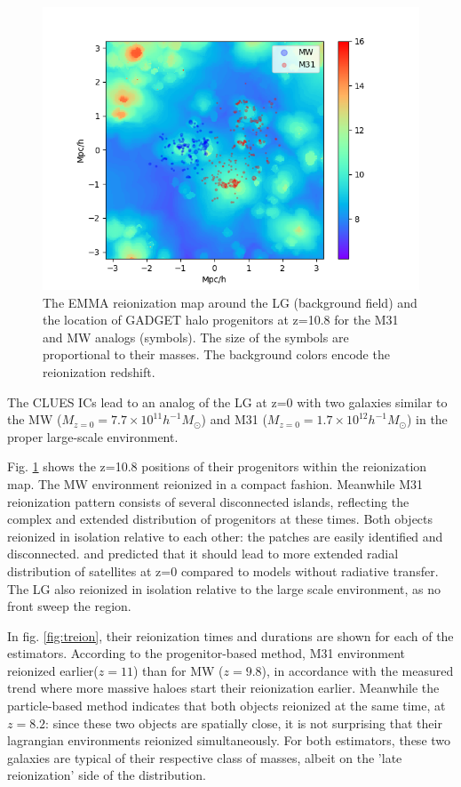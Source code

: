 \documentclass[twocolumn]{aastex61}
\begin{document}
\begin{figure}[ht]
\includegraphics[width=1.2\columnwidth]{img/map_LG.png}
\caption{The EMMA reionization map around the LG (background field) and the location of GADGET halo progenitors at z=10.8 for the M31 and MW analogs (symbols). The size of the symbols are proportional to their masses. The background colors encode the reionization redshift.}
\label{fig:LG}
\end{figure}

The CLUES ICs lead to an analog of the LG at z=0 with two galaxies similar to the MW ($M_{z=0}=7.7\times 10^{11} h^{-1} M_\odot$) and M31 ($M_{z=0}=1.7 \times 10^{12} h^{-1} M_\odot$) in the proper large-scale environment.

Fig. \ref{fig:LG} shows the z=10.8 positions of their progenitors within the reionization map. The MW environment reionized in a compact fashion. Meanwhile M31 reionization pattern consists of several disconnected islands, reflecting the complex and extended distribution of progenitors at these times. Both objects reionized in isolation relative to each other: the patches are easily identified and disconnected. \cite{OCV11} and \cite{GIL15} predicted that it should lead to more extended radial distribution of satellites at z=0 compared to models without radiative transfer. The LG also reionized in isolation relative to the large scale environment, as no front sweep the region. 

In fig. \ref{fig:treion}, their reionization times and durations are shown for each of the estimators. According to the progenitor-based method, M31 environment reionized earlier($z=11$) than for MW ($z=9.8$), in accordance with the measured trend where more massive haloes start their reionization earlier. Meanwhile the particle-based method indicates that both objects reionized at the same time, at $z=8.2$: since these two objects are spatially close, it is not surprising that their lagrangian environments reionized simultaneously. For both estimators, these two galaxies are typical of their respective class of masses, albeit on the 'late reionization' side of the distribution. 
\end{document}
